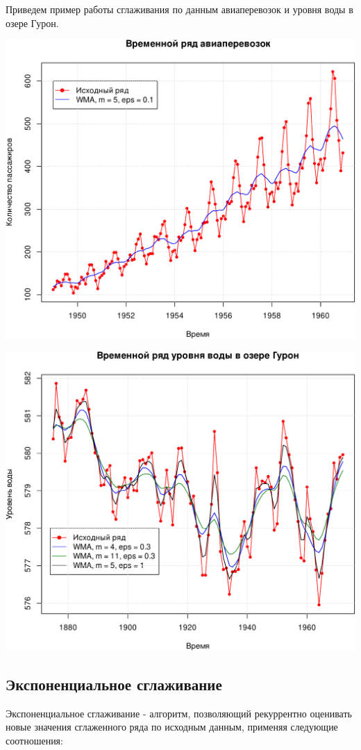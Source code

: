 \documentclass[
]{article}
\begin{document}
Приведем пример работы сглаживания по данным авиаперевозок и уровня воды
в озере Гурон.

\begin{center}\includegraphics[width=0.6\linewidth]{Prac6_files/figure-latex/unnamed-chunk-9-1} \end{center}

\begin{center}\includegraphics[width=0.6\linewidth]{Prac6_files/figure-latex/unnamed-chunk-10-1} \end{center}

\hypertarget{ux44dux43aux441ux43fux43eux43dux435ux43dux446ux438ux430ux43bux44cux43dux43eux435-ux441ux433ux43bux430ux436ux438ux432ux430ux43dux438ux435}{%
\subsection{\texorpdfstring{\textbf{Экспоненциальное
сглаживание}}{Экспоненциальное сглаживание}}\label{ux44dux43aux441ux43fux43eux43dux435ux43dux446ux438ux430ux43bux44cux43dux43eux435-ux441ux433ux43bux430ux436ux438ux432ux430ux43dux438ux435}}

Экспоненциальное сглаживание - алгоритм, позволяющий рекуррентно
оценивать новые значения сглаженного ряда по исходным данным, применяя
следующие соотношения:
\end{document}
